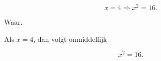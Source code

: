 \documentclass{ximera}
\begin{document}
\begin{oefening}{\oefU\ESS}
\begin{question}
\end{question}


\begin{question}

\[
x=4\Rightarrow x^2=16.
\]

\begin{oplossing}

Waar.

Als $x=4$, dan volgt onmiddellijk

\[
x^2=16.
\]

\end{oplossing}

\end{question}

\end{oefening}


\end{document}
